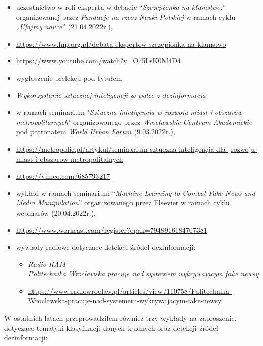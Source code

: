 \begin{itemize}
    \item uczestnictwo w roli eksperta w debacie “\emph{Szczepionka na kłamstwo.}” organizowanej przez \emph{Fundację na rzecz Nauki Polskiej} w ramach cyklu „\emph{Ufajmy nauce}” (21.04.2022r.),
    \item[] \url{https://www.fnp.org.pl/debata-ekspertow-szczepionka-na-klamstwo}
    \item[] \url{https://www.youtube.com/watch?v=O75LsK0M4D4} 
    \item wygłoszenie prelekcji pod tytułem 
    \item[] \emph{Wykorzystanie sztucznej inteligencji w walce z dezinformacją} 
    \item[] w ramach seminarium "\emph{Sztuczna inteligencja w rozwoju miast i obszarów metropolitarnych}" organizowanego przez \emph{Wrocławskie Centrum Akademickie} pod patronatem \emph{World Urban Forum} (9.03.2022r.),
    \item[] \url{https://metropolie.pl/artykul/seminarium-sztuczna-inteligencja-dla-} \url{rozwoju-miast-i-obszarow-metropolitalnych}
    \item[] \url{https://vimeo.com/685793217}
    \item wykład w ramach seminarium “\emph{Machine Learning to Combat Fake News and Media Manipulation}” organizowanego przez Elsevier w ramach cyklu webinarów (20.04.2022r.).
    \item[] \url{https://www.workcast.com/register?cpak=7948916184707381}
    \item wywiady radiowe dotyczące detekcji źródeł dezinformacji:
    \begin{itemize}
	    \item[] \emph{Radio RAM\\Politechnika Wrocławska pracuje nad systemem wykrywającym fake newsy}
	    \item[] \url{https://www.radiowroclaw.pl/articles/view/110758/Politechnika-} \url{Wroclawska-pracuje-nad-systemem-wykrywajacym-fake-newsy} 
	\end{itemize}
\end{itemize}

W ostatnich latach przeprowadziłem również trzy wykłady na zaproszenie, dotyczące tematyki klasyfikacji danych trudnych oraz detekcji źródeł dezinformacji:

